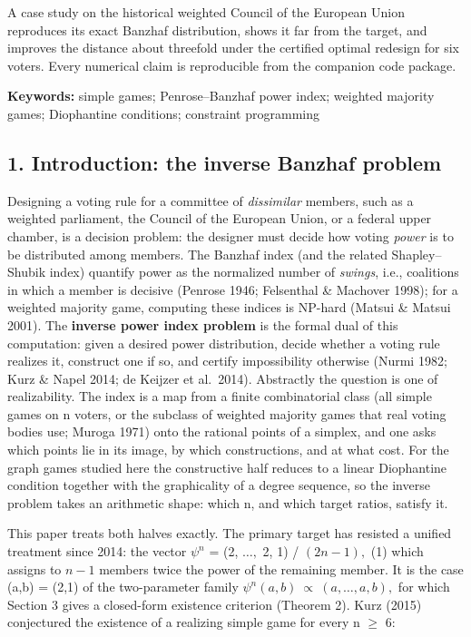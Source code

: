 \documentclass[
]{article}
\begin{document}
A case study on the historical weighted Council of the European Union
reproduces its exact Banzhaf distribution, shows it far from the target,
and improves the distance about threefold under the certified optimal
redesign for six voters. Every numerical claim is reproducible from the
companion code package.

\textbf{Keywords:} simple games; Penrose--Banzhaf power index; weighted
majority games; Diophantine conditions; constraint programming

\subsection{1. Introduction: the inverse Banzhaf
problem}\label{introduction-the-inverse-banzhaf-problem}

Designing a voting rule for a committee of \emph{dissimilar} members,
such as a weighted parliament, the Council of the European Union, or a
federal upper chamber, is a decision problem: the designer must decide
how voting \emph{power} is to be distributed among members. The Banzhaf
index (and the related Shapley--Shubik index) quantify power as the
normalized number of \emph{swings}, i.e., coalitions in which a member
is decisive (Penrose 1946; Felsenthal \& Machover 1998); for a weighted
majority game, computing these indices is NP-hard (Matsui \& Matsui
2001). The \textbf{inverse power index problem} is the formal dual of
this computation: given a desired power distribution, decide whether a
voting rule realizes it, construct one if so, and certify impossibility
otherwise (Nurmi 1982; Kurz \& Napel 2014; de Keijzer et al.~2014).
Abstractly the question is one of realizability. The index is a map from
a finite combinatorial class (all simple games on n voters, or the
subclass of weighted majority games that real voting bodies use; Muroga
1971) onto the rational points of a simplex, and one asks which points
lie in its image, by which constructions, and at what cost. For the
graph games studied here the constructive half reduces to a linear
Diophantine condition together with the graphicality of a degree
sequence, so the inverse problem takes an arithmetic shape: which n, and
which target ratios, satisfy it.

This paper treats both halves exactly. The primary target has resisted a
unified treatment since 2014: the vector \(\psi^n\) = (2, \(\dots,\) 2,
1) / \((2n-1),\) (1) which assigns to \(n-1\) members twice the power of
the remaining member. It is the case (a,b) = (2,1) of the two-parameter
family \(\psi^n(a,b)\ \propto\ (a,\dots,a,b),\) for which Section 3
gives a closed-form existence criterion (Theorem 2). Kurz (2015)
conjectured the existence of a realizing simple game for every n \(\ge\)
6:
\end{document}
